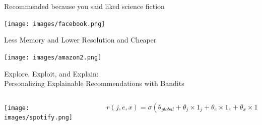 \documentclass[11pt,aspectratio=169,handout]{beamer}
\begin{document}
\begin{frame}

\begin{tcolorbox}[colback=info!5,colframe=info!80,title=Content-based]
Recommended because you said liked science fiction
\end{tcolorbox}

\vfill

\begin{center}
\texttt{[image: images/facebook.png]}
\end{center}

\end{frame}

\begin{frame}

\begin{tcolorbox}[colback=info!5,colframe=info!80,title=Knowledge-based]
Less Memory and Lower Resolution and Cheaper
\end{tcolorbox}

\vfill

\begin{center}
\texttt{[image: images/amazon2.png]}
\end{center}

\end{frame}

\begin{frame}{Explore, Exploit, and Explain: \\ Personalizing Explainable Recommendations with Bandits \cite{EX3}}

\begin{columns}
\begin{column}{0.4\textwidth}
\begin{center}
\texttt{[image: images/spotify.png]}
\end{center}
\end{column}

\begin{column}{0.5\textwidth}
\[
r(j, e, x) = \sigma(\theta_{global} + \theta_{j} \times 1_j + \theta_e \times 1_e + \theta_x \times 1_x)
\]
\end{column}
\end{columns}

\end{frame}
\end{document}
